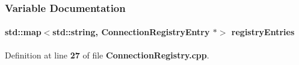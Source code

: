 \subsubsection{Variable Documentation}
\paragraph[{registry\+Entries}]{\setlength{\rightskip}{0pt plus 5cm}std\+::map$<$std\+::string, {\bf Connection\+Registry\+Entry} $\ast$$>$ registry\+Entries\hspace{0.3cm}{\ttfamily [static]}}\label{ConnectionRegistry_8cpp_accf879af4b411f466176c3fe04dd7494}


Definition at line {\bf 27} of file {\bf Connection\+Registry.\+cpp}.

